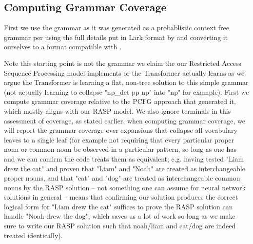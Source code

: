 \documentclass[11pt]{article}
\begin{document}
\clearpage

\subsection{Computing Grammar Coverage}
\label{computing_grammar_coverage}

First we use the grammar as it was generated as a probablistic context free grammar per \cite{KimLinzen2020}
using the full details put in Lark format by \cite{klinger2024compositionalprogramgenerationfewshot}
and converting it ourselves to a format compatible with \cite{fuzzingbook2023:GrammarCoverageFuzzer}.

Note this starting point is not the grammar we claim the our Restricted Access Sequence Processing model implements or the Transformer actually learns as we argue the Transformer is learning a flat, non-tree solution to this simple grammar (not actually learning to collapse "np\_det pp np" into "np" for example). First we compute grammar coverage relative to the PCFG approach that generated it, which mostly aligns with our RASP model. We also ignore terminals in this assessment of coverage, as stated earlier, when computing grammar coverage, we will report the grammar coverage over expansions that collapse all vocabulary leaves to a single leaf (for example not requiring that every particular proper noun or common noun be observed in a particular pattern, so long as one has and we can confirm the code treats them as equivalent; e.g. having tested "Liam drew the cat" and proven that "Liam" and "Noah" are treated as interchangeable proper nouns, and that "cat" and "dog" are treated as interchangeable common nouns by the RASP solution -- not something one can assume for neural network solutions in general -- means that confirming our solution produces the correct logical form for "Liam drew the cat" suffices to prove the RASP solution can handle "Noah drew the dog", which saves us a lot of work so long as we make sure to write our RASP solution such that noah/liam and cat/dog are indeed treated identically).
\end{document}

